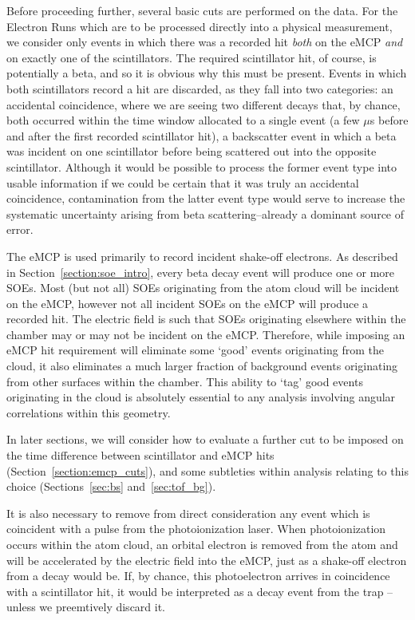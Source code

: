 Before proceeding further, several basic cuts are performed on the data.  For the Electron Runs which are to be processed directly into a physical measurement, we consider only events in which there was a recorded hit \emph{both} on the eMCP \emph{and} on exactly one of the scintillators.  The required scintillator hit, of course, is potentially a beta, and so it is obvious why this must be present.  Events in which both scintillators record a hit are discarded, as they fall into two categories:  an accidental coincidence, where we are seeing two different decays that, by chance, both occurred within the time window allocated to a single event (a few $\mu$s before and after the first recorded scintillator hit), a backscatter event in which a beta was incident on one scintillator before being scattered out into the opposite scintillator.  Although it would be possible to process the former event type into usable information if we could be certain that it was truly an accidental coincidence, contamination from the latter event type would serve to increase the systematic uncertainty arising from beta scattering--already a dominant source of error.


The eMCP is used primarily to record incident shake-off electrons.  As described in Section~\ref{section:soe_intro}, every beta decay event will produce one or more SOEs.  Most (but not all) SOEs originating from the atom cloud will be incident on the eMCP, 
however not all incident SOEs on the eMCP will produce a recorded hit.  The electric field is such that SOEs originating elsewhere within the chamber may or may not be incident on the eMCP.  Therefore, while imposing an eMCP hit requirement will eliminate some `good' events originating from the cloud, it also eliminates a much larger fraction of background events originating from other surfaces within the chamber.  This ability to `tag' good events originating in the cloud is absolutely essential to any analysis involving angular correlations within this geometry.


In later sections, we will consider how to evaluate a further cut to be imposed on the time difference between scintillator and eMCP hits (Section~\ref{section:emcp_cuts}), and some subtleties within analysis relating to this choice (Sections~\ref{sec:bs} and~\ref{sec:tof_bg}).

It is also necessary to remove from direct consideration any event which is coincident with a pulse from the photoionization laser.  When photoionization occurs within the atom cloud, an orbital electron is removed from the atom and will be accelerated by the electric field into the eMCP, just as a shake-off electron from a decay would be.  If, by chance, this photoelectron arrives in coincidence with a scintillator hit, it would be interpreted as a decay event from the trap -- unless we preemtively discard it.  

